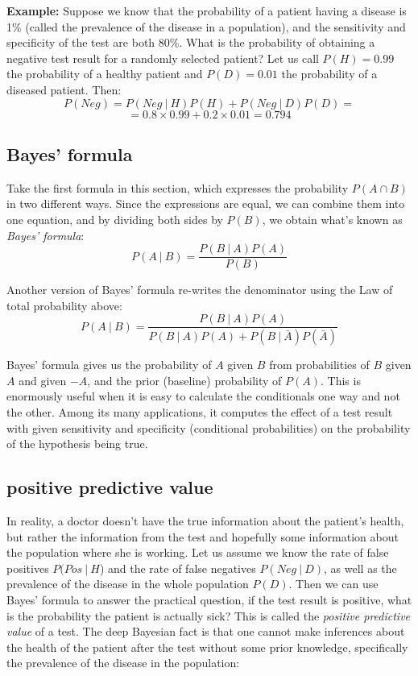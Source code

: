 \documentclass[
  letterpaper,
  DIV=11,
  numbers=noendperiod]{scrreprt}
\begin{document}
\textbf{Example:} Suppose we know that the probability of a patient
having a disease is 1\% (called the prevalence of the disease in a
population), and the sensitivity and specificity of the test are both
80\%. What is the probability of obtaining a negative test result for a
randomly selected patient? Let us call \(P(H) = 0.99\) the probability
of a healthy patient and \(P(D) = 0.01\) the probability of a diseased
patient. Then:
\[ P(Neg) =  P(Neg  \ \vert \  H) P(H) + P(Neg  \ \vert \  D)P(D)  = \]
\[ = 0.8 \times 0.99 + 0.2 \times 0.01 = 0.794\]

\hypertarget{bayes-formula}{%
\subsection{Bayes' formula}\label{bayes-formula}}

Take the first formula in this section, which expresses the probability
\(P(A \cap B)\) in two different ways. Since the expressions are equal,
we can combine them into one equation, and by dividing both sides by
\(P(B)\), we obtain what's known as \emph{Bayes' formula}:
\[ P(A \ \vert \ B) = \frac{P(B \ \vert \ A) P(A)}{P(B) }\]

Another version of Bayes' formula re-writes the denominator using the
Law of total probability above: \[
P(A \ \vert \ B) = \frac{P(B \ \vert \ A)P(A)}{P(B \ \vert \ A) P(A) + P(B \ \vert \ \bar A)P( \bar A)}
\]

Bayes' formula gives us the probability of \(A\) given \(B\) from
probabilities of \(B\) given \(A\) and given \(-A\), and the prior
(baseline) probability of \(P(A)\). This is enormously useful when it is
easy to calculate the conditionals one way and not the other. Among its
many applications, it computes the effect of a test result with given
sensitivity and specificity (conditional probabilities) on the
probability of the hypothesis being true.

\hypertarget{positive-predictive-value}{%
\subsection{positive predictive value}\label{positive-predictive-value}}

In reality, a doctor doesn't have the true information about the
patient's health, but rather the information from the test and hopefully
some information about the population where she is working. Let us
assume we know the rate of false positives \(P(Pos \ \vert \ H\)) and
the rate of false negatives \(P(Neg \ \vert \  D)\), as well as the
prevalence of the disease in the whole population \(P(D)\). Then we can
use Bayes' formula to answer the practical question, if the test result
is positive, what is the probability the patient is actually sick? This
is called the \emph{positive predictive value} of a test. The deep
Bayesian fact is that one cannot make inferences about the health of the
patient after the test without some prior knowledge, specifically the
prevalence of the disease in the population:
\end{document}
